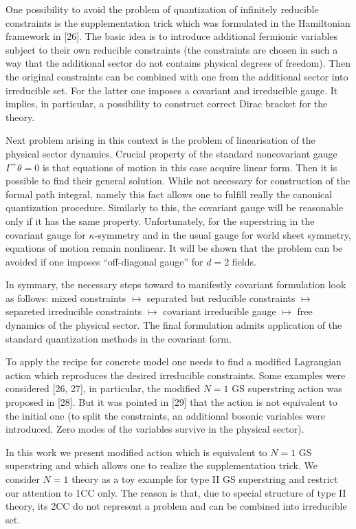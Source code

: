 \documentclass[a4paper]{article}
\begin{document}
One possibility to avoid the problem of quantization of infinitely 
reducible constraints is the supplementation trick which was formulated 
in the Hamiltonian framework in [26]. The basic idea is to introduce 
additional fermionic variables subject to their own reducible 
constraints (the constraints are chosen in such a way that the additional 
sector do not contains physical degrees of freedom). Then the original 
constraints can be combined with one from the additional sector into 
irreducible set. For the latter one imposes a covariant and irreducible 
gauge. It implies, in particular, a possibility to construct correct 
Dirac bracket for the theory. 

Next problem arising in this context is the problem of linearisation 
of the physical sector dynamics. Crucial property of the standard 
noncovariant gauge $\Gamma^+\theta=0$ is that equations of motion in 
this case acquire linear form. Then it is possible to find their 
general solution. While not necessary for construction of the formal 
path integral, namely this fact allows one to fulfill really the 
canonical quantization procedure. Similarly to this, the covariant 
gauge will be reasonable only if it has the same property. 
Unfortunately, for the superstring in the covariant gauge for 
$\kappa$-symmetry and in the usual gauge for world sheet symmetry, 
equations of motion remain nonlinear. It will be shown that the 
problem can be avoided if one imposes ``off-diagonal gauge'' for 
$d=2$ fields. 

In symmary, the necessary steps toward to manifestly covariant 
formulation look as follows: mixed constraints $\mapsto$ separated but 
reducible constraints $\mapsto$ separeted irreducible constraints 
$\mapsto$ covariant irreducible gauge $\mapsto$ free dynamics of the 
physical sector. The final formulation admits application of the 
standard quantization methods in the covariant form.

To apply the recipe for concrete model one needs to find a modified 
Lagrangian action which reproduces the desired irreducible constraints. 
Some examples were considered [26, 27], in particular, the modified 
$N=1$ GS superstring  action was proposed in [28]. But it was pointed 
in [29]  that the action is not equivalent to the initial one (to split 
the constraints, an additional bosonic variables were introduced. Zero 
modes of the variables survive in the physical sector).

In this work we present modified action which is equivalent to $N=1$ 
GS superstring and which allows one to realize the supplementation 
trick. We consider $N=1$ theory as a toy example for type II GS 
superstring and restrict our attention to 1CC only. The reason is that, 
due to special structure of type II theory, its 2CC do not represent 
a problem and can be combined into irreducible set.
\end{document}
